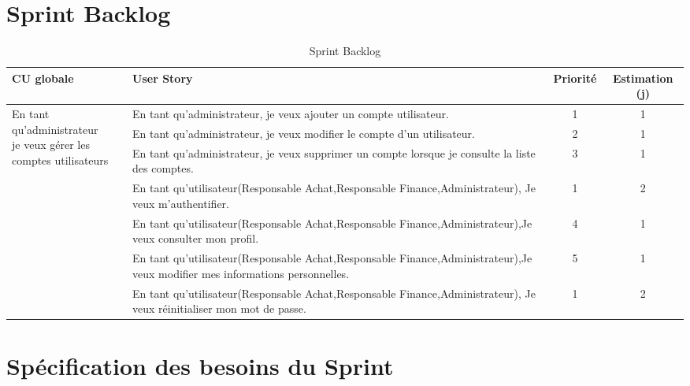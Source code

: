 \documentclass[a4paper,11pt]{report}
\begin{document}
\section{Sprint Backlog}
\begin{table}[htbp]
  \centering
  \caption{Sprint Backlog}
  \label{tab:sprint-backlog}
  \begin{tabular}{|p{3cm}|p{8cm}|c|c|}
    \hline
    \textbf{CU globale} 
      & \textbf{User Story} 
      & \textbf{Priorité} 
      & \textbf{Estimation (j)} \\ 
    \hline
    \multirow{3}{=}{\parbox{3cm}{En tant qu’administrateur\\je veux gérer les\\comptes utilisateurs}}
      & En tant qu’administrateur, je veux ajouter un compte utilisateur. 
      & 1 & 1 \\ \cline{2-4}
    & En tant qu’administrateur, je veux modifier le compte d’un utilisateur. 
      & 2 & 1 \\ \cline{2-4}
    & En tant qu’administrateur, je veux supprimer un compte lorsque je consulte la liste des comptes. 
      & 3 & 1 \\ 
    \hline
    \multirow{4}{=}{\parbox{3cm}{}}
      & En tant qu’utilisateur(Responsable Achat,Responsable Finance,Administrateur), Je veux m’authentifier. 
      & 1 & 2 \\ \cline{2-4}
    & En tant qu’utilisateur(Responsable Achat,Responsable Finance,Administrateur),Je veux consulter mon profil. 
      & 4 & 1 \\ \cline{2-4}
    & En tant qu’utilisateur(Responsable Achat,Responsable Finance,Administrateur),Je veux modifier mes informations personnelles. 
      & 5 & 1 \\ \cline{2-4}
    & En tant qu’utilisateur(Responsable Achat,Responsable Finance,Administrateur), Je veux réinitialiser mon mot de passe. 
      & 1 & 2 \\
    \hline
  \end{tabular}
\end{table}

















\section{Spécification des besoins du Sprint}
\end{document}

